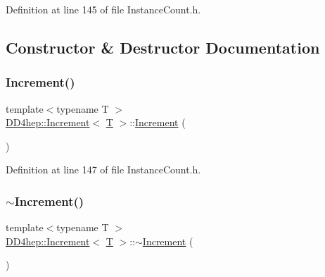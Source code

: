 Definition at line 145 of file Instance\+Count.\+h.



\subsection{Constructor \& Destructor Documentation}
\hypertarget{struct_d_d4hep_1_1_increment_a50a4d78633dc0e8b3eca298c9e09bbb8}{}\label{struct_d_d4hep_1_1_increment_a50a4d78633dc0e8b3eca298c9e09bbb8} 
\subsubsection{\texorpdfstring{Increment()}{Increment()}}
{\footnotesize\ttfamily template$<$typename T $>$ \\
\hyperlink{struct_d_d4hep_1_1_increment}{D\+D4hep\+::\+Increment}$<$ \hyperlink{class_t}{T} $>$\+::\hyperlink{struct_d_d4hep_1_1_increment}{Increment} (\begin{DoxyParamCaption}{ }\end{DoxyParamCaption})\hspace{0.3cm}{\ttfamily [inline]}}



Definition at line 147 of file Instance\+Count.\+h.

\hypertarget{struct_d_d4hep_1_1_increment_ad2148abb952e3dbd20b46c081851affc}{}\label{struct_d_d4hep_1_1_increment_ad2148abb952e3dbd20b46c081851affc} 
\subsubsection{\texorpdfstring{$\sim$\+Increment()}{~Increment()}}
{\footnotesize\ttfamily template$<$typename T $>$ \\
\hyperlink{struct_d_d4hep_1_1_increment}{D\+D4hep\+::\+Increment}$<$ \hyperlink{class_t}{T} $>$\+::$\sim$\hyperlink{struct_d_d4hep_1_1_increment}{Increment} (\begin{DoxyParamCaption}{ }\end{DoxyParamCaption})\hspace{0.3cm}{\ttfamily [inline]}}



